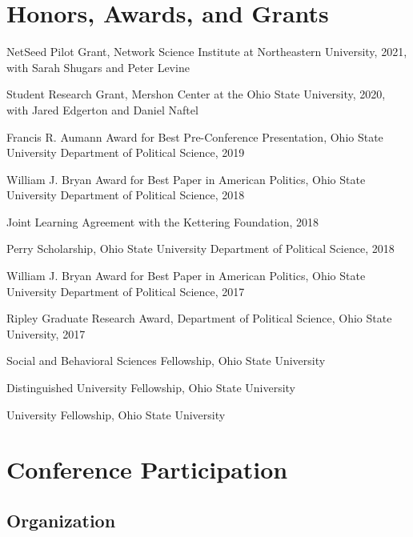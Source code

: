 \documentclass[letterpaper]{article}
\renewenvironment{itemize}{
  \begin{list}{}{
    \setlength{\leftmargin}{1.5em}
  }
}{
  \end{list}
}
\begin{document}
\section*{Honors, Awards, and Grants}

\begin{itemize}

\item NetSeed Pilot Grant, Network Science Institute at Northeastern University, 2021, with Sarah Shugars and Peter Levine

\item Student Research Grant, Mershon Center at the Ohio State University, 2020, with Jared Edgerton and Daniel Naftel

\item Francis R. Aumann Award for Best Pre-Conference Presentation, Ohio State University Department of Political Science, 2019

\item William J. Bryan Award for Best Paper in American Politics, Ohio State University Department of Political Science, 2018

\item Joint Learning Agreement with the Kettering Foundation, 2018

\item Perry Scholarship, Ohio State University Department of Political Science, 2018

\item William J. Bryan Award for Best Paper in American Politics, Ohio State University Department of Political Science, 2017

\item Ripley Graduate Research Award, Department of Political Science, Ohio State University, 2017

\item Social and Behavioral Sciences Fellowship, Ohio State University

\item Distinguished University Fellowship, Ohio State University

\item University Fellowship, Ohio State University
\end{itemize}

\section*{Conference Participation}

\subsection*{Organization}
\end{document}
